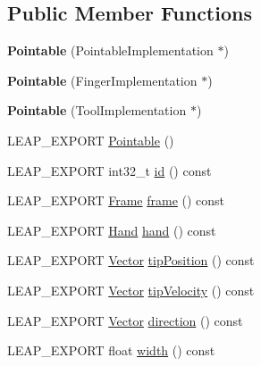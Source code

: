 \subsection*{Public Member Functions}
\begin{DoxyCompactItemize}
\item 
\mbox{\label{class_leap_1_1_pointable_a508745ae2e3402b4f754028197575457}} 
{\bfseries Pointable} (Pointable\+Implementation $\ast$)
\item 
\mbox{\label{class_leap_1_1_pointable_a20653c8953646cef96d78684f7e2c349}} 
{\bfseries Pointable} (Finger\+Implementation $\ast$)
\item 
\mbox{\label{class_leap_1_1_pointable_afa744fc2a9d312958a06d0d0a93f6799}} 
{\bfseries Pointable} (Tool\+Implementation $\ast$)
\item 
L\+E\+A\+P\+\_\+\+E\+X\+P\+O\+RT \hyperlink{class_leap_1_1_pointable_a5b42d880b673daa25c938d9fcf8d93eb}{Pointable} ()
\item 
L\+E\+A\+P\+\_\+\+E\+X\+P\+O\+RT int32\+\_\+t \hyperlink{class_leap_1_1_pointable_a4946a6fe0e478488a3d3ab3c3dbf390f}{id} () const
\item 
L\+E\+A\+P\+\_\+\+E\+X\+P\+O\+RT \hyperlink{class_leap_1_1_frame}{Frame} \hyperlink{class_leap_1_1_pointable_a3519d0129ec49ea005d047bc8805c27f}{frame} () const
\item 
L\+E\+A\+P\+\_\+\+E\+X\+P\+O\+RT \hyperlink{class_leap_1_1_hand}{Hand} \hyperlink{class_leap_1_1_pointable_a89be2f42b609738fc1869e23be4a0374}{hand} () const
\item 
L\+E\+A\+P\+\_\+\+E\+X\+P\+O\+RT \hyperlink{struct_leap_1_1_vector}{Vector} \hyperlink{class_leap_1_1_pointable_a5f0fcdb12d86567f1c1770d8c8941b17}{tip\+Position} () const
\item 
L\+E\+A\+P\+\_\+\+E\+X\+P\+O\+RT \hyperlink{struct_leap_1_1_vector}{Vector} \hyperlink{class_leap_1_1_pointable_a20994b306714ee014523136e0c551b9e}{tip\+Velocity} () const
\item 
L\+E\+A\+P\+\_\+\+E\+X\+P\+O\+RT \hyperlink{struct_leap_1_1_vector}{Vector} \hyperlink{class_leap_1_1_pointable_ada6f5dd7959f4bc437667065cd18e03e}{direction} () const
\item 
L\+E\+A\+P\+\_\+\+E\+X\+P\+O\+RT float \hyperlink{class_leap_1_1_pointable_ae5c75d491542529cfb61a91fe3865522}{width} () const
\item 

\end{DoxyCompactItemize}
